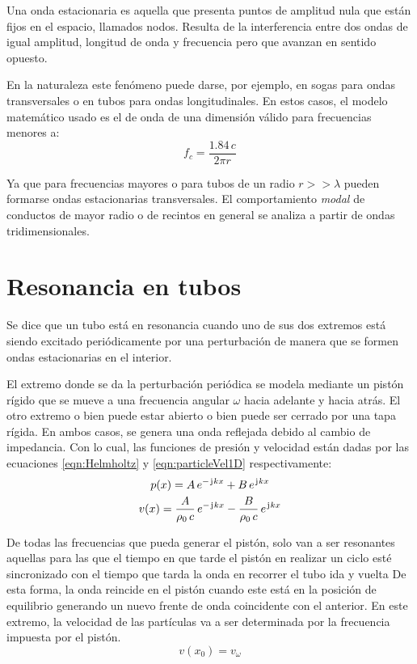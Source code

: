 \documentclass[a5paper,12pt,twoside]{book}
\begin{document}
Una onda estacionaria es aquella que presenta puntos de amplitud nula que están fijos en el espacio, llamados nodos.
Resulta de la interferencia entre dos ondas de igual amplitud, longitud de onda y frecuencia pero que avanzan en sentido opuesto.

En la naturaleza este fenómeno puede darse, por ejemplo, en sogas para ondas transversales o en tubos para ondas longitudinales.
En estos casos, el modelo matemático usado es el de onda de una dimensión válido para frecuencias menores a:
\begin{equation*}
    f_c = \frac{1.84 \, c}{2\pi r}
\end{equation*}

Ya que para frecuencias mayores o para tubos de un radio $r>>\lambda$ pueden formarse ondas estacionarias transversales.
El comportamiento \emph{modal} de conductos de mayor radio o de recintos en general se analiza a partir de ondas tridimensionales.


\section{Resonancia en tubos}

Se dice que un tubo está en resonancia cuando uno de sus dos extremos está siendo excitado periódicamente por una perturbación de manera que se formen ondas estacionarias en el interior.

El extremo donde se da la perturbación periódica se modela mediante un pistón rígido que se mueve a una frecuencia angular $\omega$ hacia adelante y hacia atrás.
El otro extremo o bien puede estar abierto o bien puede ser cerrado por una tapa rígida.
En ambos casos, se genera una onda reflejada debido al cambio de impedancia.
Con lo cual, las funciones de presión y velocidad están dadas por las ecuaciones \ref{eqn:Helmholtz} y \ref{eqn:particleVel1D} respectivamente:
\begin{gather}
    p(x) = A \, e^{-\mkern2mu\mathrm{j}\mkern1mu k x} + B \, e^{\mkern2mu\mathrm{j}\mkern1mu k x}
    \label{eqn:tubePressure}
    \\
    v(x) = \frac{A}{\rho_0 \, c} \, e^{-\mkern2mu\mathrm{j}\mkern1mu k x} - \frac{B}{\rho_0 \, c} \, e^{\mkern2mu\mathrm{j}\mkern1mu k x}
    \label{eqn:tubeVelocity}
\end{gather}

De todas las frecuencias que pueda generar el pistón, solo van a ser resonantes aquellas para las que el tiempo en que tarde el pistón en realizar un ciclo esté sincronizado con el tiempo que tarda la onda en recorrer el tubo ida y vuelta
De esta forma, la onda reincide en el pistón cuando este está en la posición de equilibrio generando un nuevo frente de onda coincidente con el anterior.
En este extremo, la velocidad de las partículas va a ser determinada por la frecuencia impuesta por el pistón.
\begin{equation}
    v(x_0) = v_\omega
    \label{eqn:tubeV0}
\end{equation}
\end{document}

